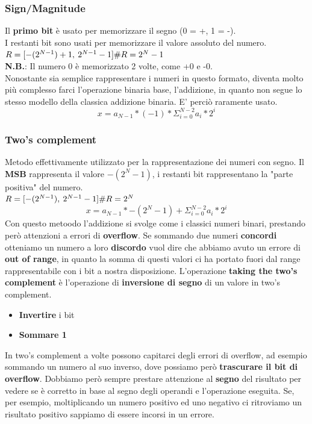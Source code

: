 \documentclass{report}
\begin{document}
        \subsubsection{Sign/Magnitude}
            Il \textbf{primo bit} è usato per memorizzare il segno (0 = +, 1 = -). \\
            I restanti bit sono usati per memorizzare il valore assoluto del numero. \\
            $R = [-(2^{N-1}) + 1, \: 2^{N-1} - 1] \\
            \#R = 2^N - 1
            $ \\
            \textbf{N.B.}: Il numero 0 è memorizzato 2 volte, come +0 e -0. \\
            Nonostante sia semplice rappresentare i numeri in questo formato, diventa
            molto più complesso farci l'operazione binaria base, l'addizione, in quanto
            non segue lo stesso modello della classica addizione binaria. E' perciò
            raramente usato.
            $$ x = a_{N-1} * (-1) * \Sigma_{i = 0}^{N-2} a_i * 2^i $$
        \subsubsection{Two's complement}
            Metodo effettivamente utilizzato per la rappresentazione dei numeri con segno.
            Il \textbf{MSB} rappresenta il valore $-(2^N-1)$, i restanti bit rappresentano 
            la "parte positiva" del numero. \\
            $R = [-(2^{N-1}), \: 2^{N-1} - 1] \\
            \#R = 2^N
            $ \\
            $$ x = a_{N-1} * -(2^N-1) + \Sigma_{i = 0}^{N-2} a_i * 2^i $$
            Con questo metoodo l'addizione si svolge come i classici numeri binari, 
            prestando però attenzioni a errori di \textbf{overflow}.
            Se sommando due numeri \textbf{concordi} otteniamo un numero a loro \textbf{discordo}
            vuol dire che abbiamo avuto un errore di \textbf{out of range}, in quanto la somma
            di questi valori ci ha portato fuori dal range rappresentabile con i bit a nostra
            disposizione.
            L'operazione \textbf{taking the two's complement} è l'operazione di
            \textbf{inversione di segno} di un valore in two's complement.
            \begin{itemize}
                \item \textbf{Invertire} i bit
                \item \textbf{Sommare 1}
            \end{itemize}
            In two's complement a volte possono capitarci degli errori di overflow, ad 
            esempio sommando un numero al suo inverso, dove possiamo però \textbf{trascurare 
            il bit di overflow}. Dobbiamo però sempre prestare attenzione al 
            \textbf{segno} del risultato per vedere se è corretto in base al segno 
            degli operandi e l'operazione eseguita. Se, per esempio, moltiplicando
            un numero positivo ed uno negativo ci ritroviamo un risultato positivo
            sappiamo di essere incorsi in un errore.
\end{document}
